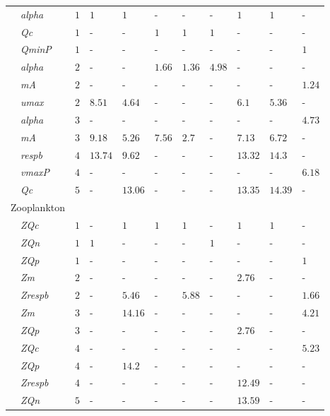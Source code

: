 \documentclass[letterpaper,12pt,oneside]{article}\usepackage[]{graphicx}\usepackage[]{color}
\begin{document}
\begin{table}[!tbp]
{\begin{center}
\begin{tabular}{llllllllll}
~~\footnotesize{\textit{alpha}}&$1$&$1$&$1$&-&-&-&$1$&$1$&-\tabularnewline
~~\footnotesize{\textit{Qc}}&$1$&-&-&$1$&$1$&$1$&-&-&-\tabularnewline
~~\footnotesize{\textit{QminP}}&$1$&-&-&-&-&-&-&-&$1$\tabularnewline
~~\footnotesize{\textit{alpha}}&$2$&-&-&$1.66$&$1.36$&$4.98$&-&-&-\tabularnewline
~~\footnotesize{\textit{mA}}&$2$&-&-&-&-&-&-&-&$1.24$\tabularnewline
~~\footnotesize{\textit{umax}}&$2$&$8.51$&$4.64$&-&-&-&$6.1$&$5.36$&-\tabularnewline
~~\footnotesize{\textit{alpha}}&$3$&-&-&-&-&-&-&-&$4.73$\tabularnewline
~~\footnotesize{\textit{mA}}&$3$&$9.18$&$5.26$&$7.56$&$2.7$&-&$7.13$&$6.72$&-\tabularnewline
~~\footnotesize{\textit{respb}}&$4$&$13.74$&$9.62$&-&-&-&$13.32$&$14.3$&-\tabularnewline
~~\footnotesize{\textit{vmaxP}}&$4$&-&-&-&-&-&-&-&$6.18$\tabularnewline
~~\footnotesize{\textit{Qc}}&$5$&-&$13.06$&-&-&-&$13.35$&$14.39$&-\tabularnewline
\hline
{Zooplankton}&&&&&&&&&\tabularnewline
~~\footnotesize{\textit{ZQc}}&$1$&-&$1$&$1$&$1$&-&$1$&$1$&-\tabularnewline
~~\footnotesize{\textit{ZQn}}&$1$&$1$&-&-&-&$1$&-&-&-\tabularnewline
~~\footnotesize{\textit{ZQp}}&$1$&-&-&-&-&-&-&-&$1$\tabularnewline
~~\footnotesize{\textit{Zm}}&$2$&-&-&-&-&-&$2.76$&-&-\tabularnewline
~~\footnotesize{\textit{Zrespb}}&$2$&-&$5.46$&-&$5.88$&-&-&-&$1.66$\tabularnewline
~~\footnotesize{\textit{Zm}}&$3$&-&$14.16$&-&-&-&-&-&$4.21$\tabularnewline
~~\footnotesize{\textit{ZQp}}&$3$&-&-&-&-&-&$2.76$&-&-\tabularnewline
~~\footnotesize{\textit{ZQc}}&$4$&-&-&-&-&-&-&-&$5.23$\tabularnewline
~~\footnotesize{\textit{ZQp}}&$4$&-&$14.2$&-&-&-&-&-&-\tabularnewline
~~\footnotesize{\textit{Zrespb}}&$4$&-&-&-&-&-&$12.49$&-&-\tabularnewline
~~\footnotesize{\textit{ZQn}}&$5$&-&-&-&-&-&$13.59$&-&-\tabularnewline
\hline
\end{tabular}\end{center}}

\end{table}
\end{document}
